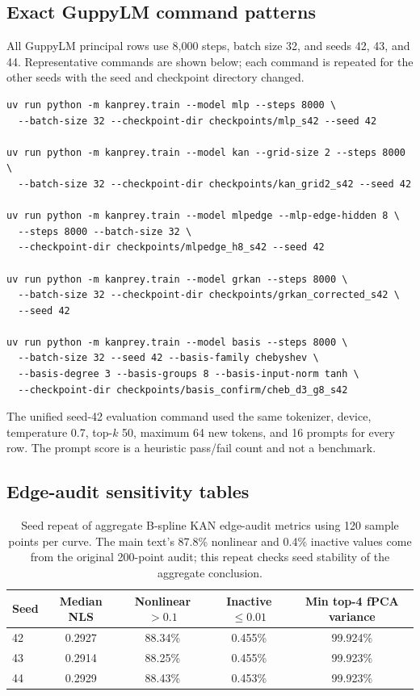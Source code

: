 \documentclass[11pt]{article}
\begin{document}
\subsection{Exact GuppyLM command patterns}

All GuppyLM principal rows use 8,000 steps, batch size 32, and seeds 42, 43, and 44. Representative commands are shown below; each command is repeated for the other seeds with the seed and checkpoint directory changed.

\begin{verbatim}
uv run python -m kanprey.train --model mlp --steps 8000 \
  --batch-size 32 --checkpoint-dir checkpoints/mlp_s42 --seed 42

uv run python -m kanprey.train --model kan --grid-size 2 --steps 8000 \
  --batch-size 32 --checkpoint-dir checkpoints/kan_grid2_s42 --seed 42

uv run python -m kanprey.train --model mlpedge --mlp-edge-hidden 8 \
  --steps 8000 --batch-size 32 \
  --checkpoint-dir checkpoints/mlpedge_h8_s42 --seed 42

uv run python -m kanprey.train --model grkan --steps 8000 \
  --batch-size 32 --checkpoint-dir checkpoints/grkan_corrected_s42 \
  --seed 42

uv run python -m kanprey.train --model basis --steps 8000 \
  --batch-size 32 --seed 42 --basis-family chebyshev \
  --basis-degree 3 --basis-groups 8 --basis-input-norm tanh \
  --checkpoint-dir checkpoints/basis_confirm/cheb_d3_g8_s42
\end{verbatim}

The unified seed-42 evaluation command used the same tokenizer, device, temperature 0.7, top-\(k\) 50, maximum 64 new tokens, and 16 prompts for every row. The prompt score is a heuristic pass/fail count and not a benchmark.

\subsection{Edge-audit sensitivity tables}

\begin{table}[htbp]
\centering
\caption{Seed repeat of aggregate B-spline KAN edge-audit metrics using 120 sample points per curve. The main text's 87.8\% nonlinear and 0.4\% inactive values come from the original 200-point audit; this repeat checks seed stability of the aggregate conclusion.}
\label{tab:edge-stability}
\begin{tabular}{@{}lcccc@{}}
\toprule
Seed & Median NLS & Nonlinear \(>0.1\) & Inactive \(\leq0.01\) & Min top-4 fPCA variance \\
\midrule
42 & 0.2927 & 88.34\% & 0.455\% & 99.924\% \\
43 & 0.2914 & 88.25\% & 0.455\% & 99.923\% \\
44 & 0.2929 & 88.43\% & 0.453\% & 99.923\% \\
\bottomrule
\end{tabular}
\end{table}
\end{document}
